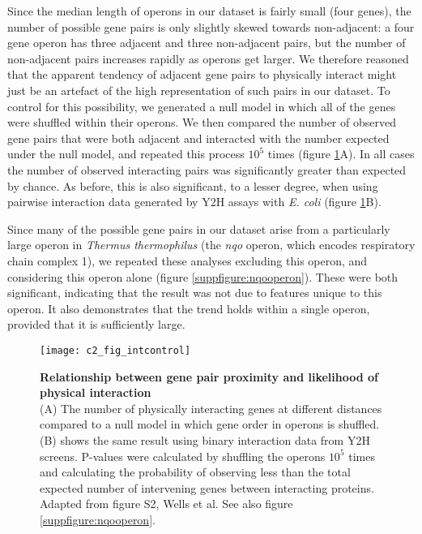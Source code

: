 \documentclass[a4paper,11pt,twoside,openright]{scrbook}
\begin{document}
Since the median length of operons in our dataset is fairly small (four genes), the number of possible gene pairs is only slightly skewed towards non-adjacent: a four gene operon has three adjacent and three non-adjacent pairs, but the number of non-adjacent pairs increases rapidly as operons get larger. We therefore reasoned that the apparent tendency of adjacent gene pairs to physically interact might just be an artefact of the high representation of such pairs in our dataset. To control for this possibility, we generated a null model in which all of the genes were shuffled within their operons. We then compared the number of observed gene pairs that were both adjacent and interacted with the number expected under the null model, and repeated this process \(10^{5}\) times (figure \ref{figure:interveningcontrol}A). In all cases the number of observed interacting pairs was significantly greater than expected by chance. As before, this is also significant, to a lesser degree, when using pairwise interaction data generated by Y2H assays with \textit{E. coli} (figure \ref{figure:interveningcontrol}B).

Since many of the possible gene pairs in our dataset arise from a particularly large operon in \textit{Thermus thermophilus} (the \textit{nqo} operon, which encodes respiratory chain complex 1), we repeated these analyses excluding this operon, and considering this operon alone (figure \ref{suppfigure:nqooperon}). These were both significant, indicating that the result was not due to features unique to this operon. It also demonstrates that the trend holds within a single operon, provided that it is sufficiently large.

\begin{figure}[h]
    \texttt{[image: c2\_fig\_intcontrol]}
    \caption[Relationship between gene pair proximity and likelihood of physical interaction]{\sffamily \textbf{Relationship between gene pair proximity and likelihood of physical interaction} \\ \small (A) The number of physically interacting genes at different distances compared to a null model in which gene order in operons is shuffled. (B) shows the same result using binary interaction data from Y2H screens\cite{Rajagopala2014}. P-values were calculated by shuffling the operons $10^{5}$ times and calculating the probability of observing less than the total expected number of intervening genes between interacting proteins. Adapted from figure S2, Wells et al. \cite{Wells2016} See also figure \ref{suppfigure:nqooperon}.}
    \label{figure:interveningcontrol}
\end{figure}
\end{document}
